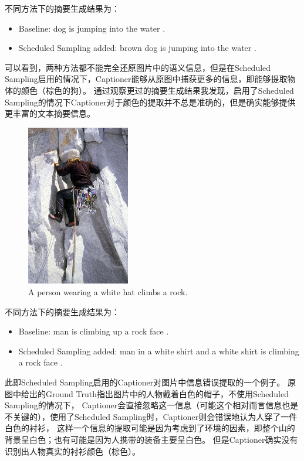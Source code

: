 \documentclass[]{ctexart}
\begin{document}
不同方法下的摘要生成结果为：
\begin{itemize}
    \item Baseline: dog is jumping into the water .
    \item Scheduled Sampling added: brown dog is jumping into the water .
\end{itemize}
可以看到，两种方法都不能完全还原图片中的语义信息，但是在Scheduled Sampling启用的情况下，Captioner能够从原图中捕获更多的信息，即能够提取物体的颜色（棕色的狗）。
通过观察更过的摘要生成结果我发现，启用了Scheduled Sampling的情况下Captioner对于颜色的提取并不总是准确的，但是确实能够提供更丰富的文本摘要信息。

\newpage
\begin{figure}[ht]
    \centering
    \includegraphics[width=0.4\textwidth]{asset/486917990_72bd4069af.jpg}
    \caption{A person wearing a white hat climbs a rock.}
    \label{demo2}
\end{figure}
不同方法下的摘要生成结果为：
\begin{itemize}
    \item Baseline: man is climbing up a rock face .
    \item Scheduled Sampling added: man in a white shirt and a white shirt is climbing a rock face .
\end{itemize}
此即Scheduled Sampling启用的Captioner对图片中信息错误提取的一个例子。
原图中给出的Ground Truth指出图片中的人物戴着白色的帽子，不使用Scheduled Sampling的情况下，
Captioner会直接忽略这一信息（可能这个相对而言信息也是不关键的），使用了Scheduled Sampling时，Captioner则会错误地认为人穿了一件白色的衬衫，
这样一个信息的提取可能是因为考虑到了环境的因素，即整个山的背景呈白色；也有可能是因为人携带的装备主要呈白色。
但是Captioner确实没有识别出人物真实的衬衫颜色（棕色）。
\end{document}
